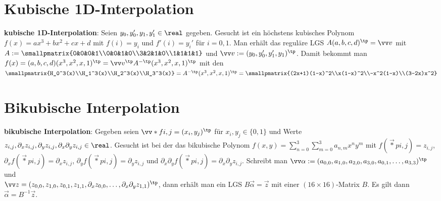 \section{%
    Kubische 1D-Interpolation%
}

\textbf{kubische 1D-Interpolation}:
Seien $y_0, y_0', y_1, y_1' \in \real$ gegeben.
Gesucht ist ein höchstens kubisches Polynom $f(x) = ax^3 + bx^2 + cx + d$
mit $f(i) = y_i$ und $f'(i) = y_i'$ für $i = 0, 1$.
Man erhält das reguläre LGS
$A (a, b, c, d)^\tp = \vec{v}$ mit
$A := \smallpmatrix{0&0&0&1\\0&0&1&0\\3&2&1&0\\1&1&1&1}$ und
$\vec{v} := (y_0, y_0', y_1', y_1)^\tp$.
Damit bekommt man
$f(x) = (a, b, c, d) (x^3, x^2, x, 1)^\tp
= \vec{v}^\tp A^{-\tp} (x^3, x^2, x, 1)^\tp$
mit den\\
$\smallpmatrix{H_0^3(x)\\H_1^3(x)\\H_2^3(x)\\H_3^3(x)}
= A^{-\tp} (x^3, x^2, x, 1)^\tp
= \smallpmatrix{(2x+1)(1-x)^2\\x(1-x)^2\\-x^2(1-x)\\(3-2x)x^2}$

\vspace*{-5mm}

\section{%
    Bikubische Interpolation%
}

\textbf{bikubische Interpolation}:
Gegeben seien $\vec*{f}{i,j} = (x_i, y_j)^\tp$ für $x_i, y_j \in \{0, 1\}$ und Werte\\
$z_{i,j}, \partial_x z_{i,j}, \partial_y z_{i,j},
\partial_x \partial_y z_{i,j} \in \real$.
Gesucht ist bei der  das bikubische Polynom
$f(x, y) = \sum_{n=0}^3 \sum_{m=0}^3 a_{n,m} x^n y^m$ mit
$f(\vec*{p}{i,j}) = z_{i,j}$,
$\partial_x f(\vec*{p}{i,j}) = \partial_x z_{i,j}$,
$\partial_y f(\vec*{p}{i,j}) = \partial_y z_{i,j}$ und
$\partial_x \partial_y f(\vec*{p}{i,j}) = \partial_x \partial_y z_{i,j}$.
Schreibt man $\vec{\alpha} := (a_{0,0}, a_{1,0}, a_{2,0}, a_{3,0}, a_{0,1}, \dotsc, a_{3,3})^\tp$
und\\
$\vec{z} = (z_{0,0}, z_{1,0}, z_{0,1}, z_{1,1}, \partial_x z_{0,0}, \dotsc,
\partial_x \partial_y z_{1,1})^\tp$,
dann erhält man ein LGS $B\vec{\alpha} = \vec{z}$
mit einer $(16 \times 16)$-Matrix $B$.
Es gilt dann $\vec{\alpha} = B^{-1} \vec{z}$.

